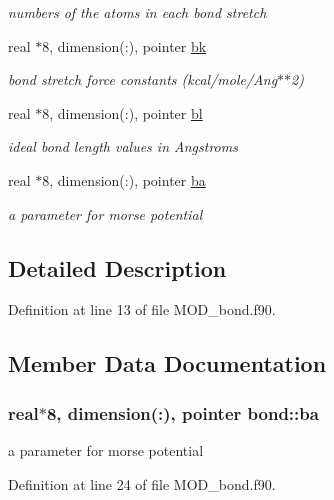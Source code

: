 \begin{DoxyCompactItemize}
\begin{DoxyCompactList}\small\item\em numbers of the atoms in each bond stretch \end{DoxyCompactList}\item 
real $\ast$8, dimension(\-:), pointer \hyperlink{classbond_a62af7114dd5e4d888588a472841a3610}{bk}
\begin{DoxyCompactList}\small\item\em bond stretch force constants (kcal/mole/\-Ang$\ast$$\ast$2) \end{DoxyCompactList}\item 
real $\ast$8, dimension(\-:), pointer \hyperlink{classbond_ad7fdd84c462fc62d6965f86fe3e1b654}{bl}
\begin{DoxyCompactList}\small\item\em ideal bond length values in Angstroms \end{DoxyCompactList}\item 
real $\ast$8, dimension(\-:), pointer \hyperlink{classbond_ad301d839e1e75aefddae43bf76d6104e}{ba}
\begin{DoxyCompactList}\small\item\em a parameter for morse potential \end{DoxyCompactList}\end{DoxyCompactItemize}


\subsection{Detailed Description}


Definition at line 13 of file M\-O\-D\-\_\-bond.\-f90.



\subsection{Member Data Documentation}
\hypertarget{classbond_ad301d839e1e75aefddae43bf76d6104e}{
\subsubsection[{ba}]{\setlength{\rightskip}{0pt plus 5cm}real$\ast$8, dimension(\-:), pointer bond\-::ba}}\label{classbond_ad301d839e1e75aefddae43bf76d6104e}


a parameter for morse potential 



Definition at line 24 of file M\-O\-D\-\_\-bond.\-f90.

